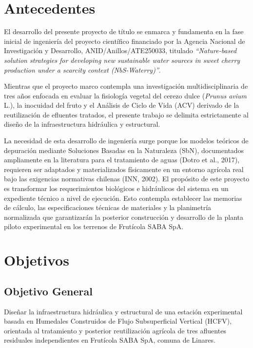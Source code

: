 \documentclass[12pt, letterpaper]{report}
\begin{document}
\section{Antecedentes}
El desarrollo del presente proyecto de título se enmarca y fundamenta en la fase inicial de ingeniería del proyecto científico financiado por la Agencia Nacional de Investigación y Desarrollo, ANID/Anillos/ATE250033, titulado \textit{“Nature-based solution strategies for developing new sustainable water sources in sweet cherry production under a scarcity context (NbS-Waterry)”}.

Mientras que el proyecto marco contempla una investigación multidisciplinaria de tres años enfocada en evaluar la fisiología vegetal del cerezo dulce (\textit{Prunus avium} L.), la inocuidad del fruto y el Análisis de Ciclo de Vida (ACV) derivado de la reutilización de efluentes tratados, el presente trabajo se delimita estrictamente al diseño de la infraestructura hidráulica y estructural.

La necesidad de esta desarrollo de ingeniería surge porque los modelos teóricos de depuración mediante Soluciones Basadas en la Naturaleza (SbN), documentados ampliamente en la literatura para el tratamiento de aguas (Dotro et al., 2017), requieren ser adaptados y materializados físicamente en un entorno agrícola real bajo las exigencias normativas chilenas (INN, 2002). El propósito de este proyecto es transformar los requerimientos biológicos e hidráulicos del sistema en un expediente técnico a nivel de ejecución. Esto contempla establecer las memorias de cálculo, las especificaciones técnicas de materiales y la planimetría normalizada que garantizarán la posterior construcción y desarrollo de la planta piloto experimental en los terrenos de Frutícola SABA SpA.


\newpage


\section{Objetivos}

\subsection{Objetivo General}
Diseñar la infraestructura hidráulica y estructural de una estación experimental basada en Humedales Construidos de Flujo Subsuperficial Vertical (HCFV), orientada al tratamiento y posterior reutilización agrícola de tres afluentes residuales independientes en Frutícola SABA SpA, comuna de Linares.
\end{document}
